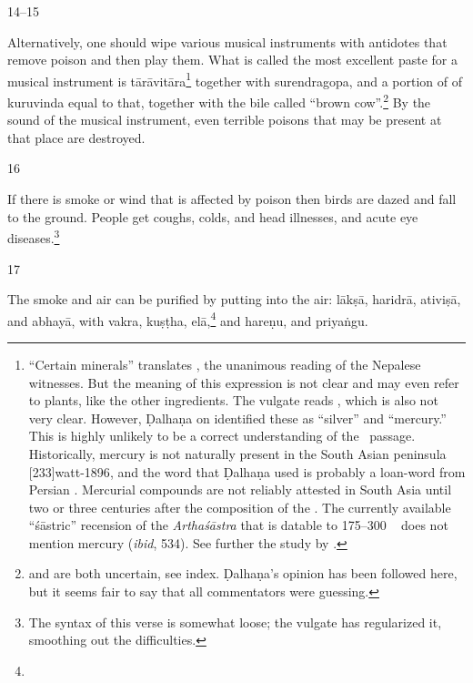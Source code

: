 \begin{translation}
\item [14--15]

Alternatively, one should wipe various musical instruments with antidotes that
remove poison and then play them.   What is called the most excellent paste for a
musical instrument is \gls{tārāvitāra}\footnote{“Certain minerals” translates
    , the unanimous reading of the Nepalese witnesses.  But the
    meaning of this expression is not clear and may even refer to plants, like the
    other ingredients.  The vulgate reads , which is also not very
    clear.  However, Ḍalhaṇa on  identified these as “silver” and
    “mercury.” This is highly unlikely to be a correct understanding of the \SS\
    passage.  Historically, mercury is not naturally present in the South Asian
    peninsula \pvolcite{5}[233]{watt-1896}, and the word \dev{pārada} that Ḍalhaṇa
    used is probably a loan-word from Persian \citep[sub \emph{paranda,
    parranda}][244b]{stei-pers}.  Mercurial compounds are not reliably attested in
    South Asia until two or three centuries after the composition of the \SS.  The
    currently available “śāstric” recension of the \emph{Arthaśāstra} that is datable
    to 175--300 \CE\ \citep[29--31]{oliv-2013} does not mention mercury (\emph{ibid},
    534).  See further the study by \citet[17, \emph{et passim}]{wuja-2013b}.} 
    together with \gls{surendragopa}, and a portion of of \gls{kuruvinda} equal to
    that, together with the bile called “brown cow”.\footnote{\dev{surendragopa} and
        \dev{kuruvinda} are both uncertain, see index. Ḍalhaṇa's opinion has been followed
        here, but it seems fair to say that all commentators were guessing.} By the sound
        of the musical instrument, even terrible poisons that may be present at that place
        are destroyed.
        
\item[16]

If there is smoke or wind that is affected by poison then birds are dazed and fall
to the ground.  People get coughs, colds, and head illnesses, and acute eye
diseases.\footnote{The syntax of this verse is somewhat loose; the vulgate has
    regularized it, smoothing out the difficulties.}

\item[17]

The smoke and air can be purified by putting into the air: 
\gls{lākṣā},
\gls{haridrā},
\gls{ativiṣā},
and
\gls{abhayā},
with
\gls{vakra},
\gls{kuṣṭha},
\gls{elā},\footnote{}
and
\gls{hareṇu},
and
\gls{priyaṅgu}.


\end{translation}
